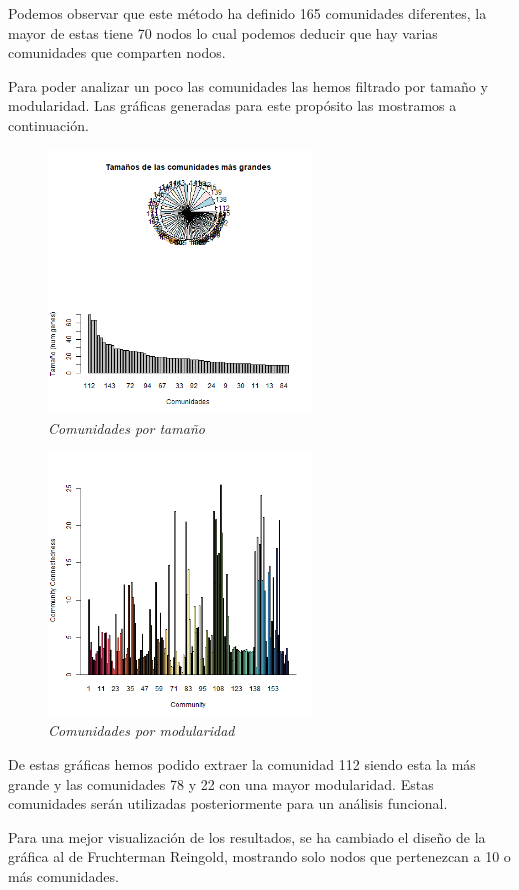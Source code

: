 Podemos observar que este método ha definido 165 comunidades diferentes, la mayor de estas tiene 70 nodos lo cual podemos deducir que hay varias comunidades que comparten nodos.

Para poder analizar un poco las comunidades las hemos filtrado por tamaño y modularidad. Las gráficas generadas para este propósito las mostramos a continuación.

 \begin{figure}
	\centering
	\includegraphics[width=70mm,scale=1.2]{figures/lc_larger_clusters.png}
	\caption{\textit{Comunidades por tamaño}}
\end{figure}

 \begin{figure}
	\centering
	\includegraphics[width=70mm,scale=1.2]{figures/clusters_modularity.png}
	\caption{\textit{Comunidades por modularidad}}
\end{figure}

De estas gráficas hemos podido extraer la comunidad 112 siendo esta la más grande y las comunidades 78 y 22 con una mayor modularidad. Estas comunidades serán utilizadas posteriormente para un análisis funcional.

Para una mejor visualización de los resultados, se ha cambiado el diseño de la gráfica al de Fruchterman Reingold, mostrando solo nodos que pertenezcan a 10 o más comunidades.


